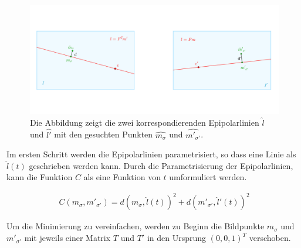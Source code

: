 \begin{figure}[!htb]
	\centering
	\includegraphics[width=.8\linewidth]{images/SampsAppxNewPoints.png}
	\caption[Sampson-Approximation: Kostenfunktion]{Die Abbildung zeigt die zwei korrespondierenden Epipolarlinien $\hat{l}$ und $\hat{l'}$ mit den gesuchten Punkten $\hat{m_\sigma}$ und $\hat{m'_{\sigma'}}$.}\label{fig:Lot}
\end{figure}



Im ersten Schritt werden die Epipolarlinien parametrisiert, so dass eine Linie als $\hat{l}(t)$ geschrieben werden kann. Durch die Parametrisierung der Epipolarlinien, kann die Funktion $C$ als eine Funktion von $t$ umformuliert werden.


\begin{gather}
	C(m_\sigma,m'_{\sigma'}) = d(m_\sigma,\hat{l}(t))^2 + d(m'_{\sigma'},\hat{l}'(t))^2
\end{gather}


%
%
Um die Minimierung zu vereinfachen, werden zu Beginn die Bildpunkte $m_\sigma$ und $m'_{\sigma'} $ mit jeweils einer Matrix $T$ und $T'$ in den Ursprung $(0,0,1)^T$ verschoben. 


